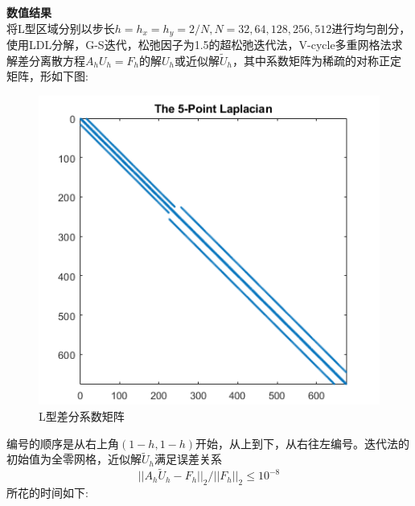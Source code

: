 \documentclass[12pt]{ctexart}
\begin{document}
\noindent \textbf{数值结果}\\
将L型区域分别以步长$h=h_x=h_y=2/N,N=32,64,128,256,512$进行均匀剖分，使用LDL分解，G-S迭代，松弛因子为1.5的超松弛迭代法，V-cycle多重网格法求解差分离散方程$A_hU_h=F_h$的解$U_h$或近似解$\tilde{U}_h$，其中系数矩阵为稀疏的对称正定矩阵，形如下图:\\
\begin{figure}[H]
	\centering
	\includegraphics[width=12cm]{差分矩阵.png}
	\caption{L型差分系数矩阵}
\end{figure}
\noindent 编号的顺序是从右上角$(1-h,1-h)$开始，从上到下，从右往左编号。迭代法的初始值为全零网格，近似解$\tilde{U}_h$满足误差关系$$||A_h\tilde{U}_h-F_h||_2/||F_h||_2 \le 10^{-8} $$所花的时间如下:\\
\end{document}
